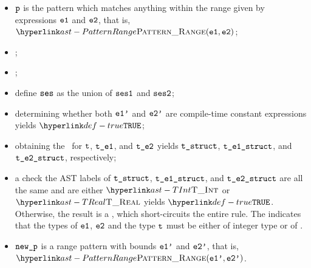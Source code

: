 \ProseParagraph
\AllApply
\begin{itemize}
  \item $\vp$ is the pattern which matches anything within the range given by
  expressions $\veone$ and $\vetwo$, that is, $\PatternRange(\veone, \vetwo)$;
  \item \Proseannotatesymbolicallyevaluableexpr{$\tenv$}{$\veone$}{$(\vteone, \veonep, \vsesone)$}\ProseOrTypeError;
  \item \Proseannotatesymbolicallyevaluableexpr{$\tenv$}{$\vetwo$}{$(\vtetwo, \vetwop, \vsestwo)$}\ProseOrTypeError;
  \item define $\vses$ as the union of $\vsesone$ and $\vsestwo$;
  \item determining whether both $\veonep$ and $\vetwop$ are compile-time constant expressions yields $\True$\ProseOrTypeError;
  \item obtaining the \underlyingtype\ for $\vt$, $\vteone$, and $\vtetwo$ yields
        $\vtstruct$, $\vteonestruct$, and $\vtetwostruct$, respectively\ProseOrTypeError;
  \item a check the AST labels of $\vtstruct$, $\vteonestruct$, and $\vtetwostruct$ are all the same and are either
        $\TInt$ or $\TReal$ yields $\True$. Otherwise, the result is a \typingerrorterm{}, which short-circuits the entire rule.
        The \typingerrorterm{} indicates that the types of
        $\veone$, $\vetwo$ and the type $\vt$ must be either of integer type or of \realtypeterm{}.
  \item $\newp$ is a range pattern with bounds $\veonep$ and $\vetwop$, that is, $\PatternRange(\veonep, \vetwop)$.
\end{itemize}
\FormallyParagraph
\begin{mathpar}
\end{mathpar}

